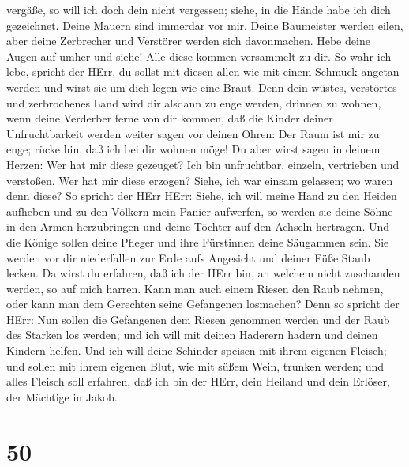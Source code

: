 vergäße, so will ich doch dein nicht vergessen;  siehe, in
die Hände habe ich dich gezeichnet. Deine Mauern sind immerdar vor mir.
 Deine Baumeister werden eilen, aber deine Zerbrecher und
Verstörer werden sich davonmachen.  Hebe deine Augen auf
umher und siehe! Alle diese kommen versammelt zu dir. So wahr ich lebe,
spricht der HErr, du sollst mit diesen allen wie mit einem Schmuck
angetan werden und wirst sie um dich legen wie eine Braut. 
Denn dein wüstes, verstörtes und zerbrochenes Land wird dir alsdann zu
enge werden, drinnen zu wohnen, wenn deine Verderber ferne von dir
kommen,  daß die Kinder deiner Unfruchtbarkeit werden
weiter sagen vor deinen Ohren: Der Raum ist mir zu enge; rücke hin, daß
ich bei dir wohnen möge!  Du aber wirst sagen in deinem
Herzen: Wer hat mir diese gezeuget? Ich bin unfruchtbar, einzeln,
vertrieben und verstoßen. Wer hat mir diese erzogen? Siehe, ich war
einsam gelassen; wo waren denn diese?  So spricht der HErr
HErr: Siehe, ich will meine Hand zu den Heiden aufheben und zu den
Völkern mein Panier aufwerfen, so werden sie deine Söhne in den Armen
herzubringen und deine Töchter auf den Achseln hertragen. 
Und die Könige sollen deine Pfleger und ihre Fürstinnen deine Säugammen
sein. Sie werden vor dir niederfallen zur Erde aufs Angesicht und deiner
Füße Staub lecken. Da wirst du erfahren, daß ich der HErr bin, an
welchem nicht zuschanden werden, so auf mich harren.  Kann
man auch einem Riesen den Raub nehmen, oder kann man dem Gerechten seine
Gefangenen losmachen?  Denn so spricht der HErr: Nun sollen
die Gefangenen dem Riesen genommen werden und der Raub des Starken los
werden; und ich will mit deinen Haderern hadern und deinen Kindern
helfen.  Und ich will deine Schinder speisen mit ihrem
eigenen Fleisch; und sollen mit ihrem eigenen Blut, wie mit süßem Wein,
trunken werden; und alles Fleisch soll erfahren, daß ich bin der HErr,
dein Heiland und dein Erlöser, der Mächtige in Jakob.

\hypertarget{section-49}{%
\section{50}\label{section-49}}

